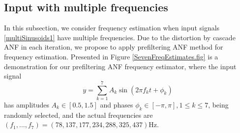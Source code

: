 \documentclass{UCF_ETD}
\begin{document}
\subsection{Input with multiple frequencies}

 In this subsection, we consider  frequency estimation when input signals
\eqref{multiSinusoids1} have multiple frequencies.
Due to the distortion by cascade ANF in each iteration, we propose to apply
prefiltering ANF method for frequency estimation.
Presented in Figure \ref{SevenFreqEstimates.fig} is
a demonstration for our prefiltering ANF frequency estimator,
where the input signal
$$y=\sum_{k=1}^7 A_k \sin (2\pi f_k t+\phi_k)$$
has amplitudes
$A_k\in [0.5, 1.5]$ and phases $\phi_k\in [-\pi, \pi], 1\le k\le 7$, being randomly selected, and
 the actual frequencies are  $(f_1, \ldots, f_7)=(78, 137, 177, 234, 288, 325, 437)$Hz.
\end{document}
